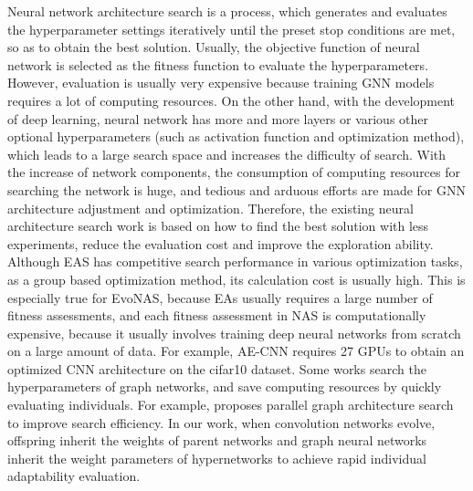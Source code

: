 \documentclass[lettersize,journal]{IEEEtran}
\begin{document}
Neural network architecture search is a process, which generates and evaluates the hyperparameter settings iteratively until the preset stop conditions are met, so as to obtain the best solution. Usually, the objective function of neural network is selected as the fitness function to evaluate the hyperparameters. However, evaluation is usually very expensive because training GNN models requires a lot of computing resources. On the other hand, with the development of deep learning, neural network has more and more layers or various other optional hyperparameters (such as activation function and optimization method), which leads to a large search space and increases the difficulty of search. With the increase of network components, the consumption of computing resources for searching the network is huge, and tedious and arduous efforts are made for GNN architecture adjustment and optimization. Therefore, the existing neural architecture search work is based on how to find the best solution with less experiments, reduce the evaluation cost and improve the exploration ability. Although EAS has competitive search performance in various optimization tasks\cite{38}, as a group based optimization method, its calculation cost is usually high. This is especially true for EvoNAS, because EAs usually requires a large number of fitness assessments, and each fitness assessment in NAS is computationally expensive, because it usually involves training deep neural networks from scratch on a large amount of data. For example, AE-CNN requires 27 GPUs to obtain an optimized CNN architecture on the cifar10 dataset. Some works search the hyperparameters of graph networks, and save computing resources by quickly evaluating individuals. For example, \cite{39} proposes parallel graph architecture search to improve search efficiency. In our work, when convolution networks evolve, offspring inherit the weights of parent networks and graph neural networks inherit the weight parameters of hypernetworks to achieve rapid individual adaptability evaluation.
\end{document}
